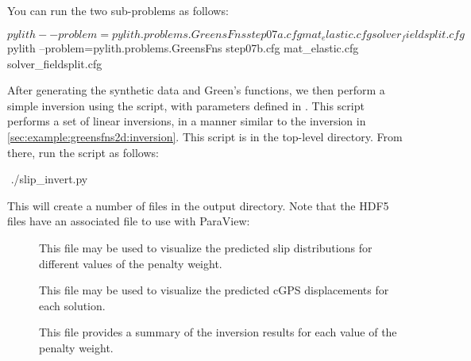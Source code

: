 You can run the two sub-problems as follows:
\begin{shell}
$$ pylith --problem=pylith.problems.GreensFns step07a.cfg
mat_elastic.cfg solver_fieldsplit.cfg
$$ pylith --problem=pylith.problems.GreensFns step07b.cfg
mat_elastic.cfg solver_fieldsplit.cfg
\end{shell}

After generating the synthetic data and Green's functions, we then
perform a simple inversion using the  script,
with parameters defined in . This script
performs a set of linear inversions, in a manner similar to the
inversion in \vref{sec:example:greensfns2d:inversion}. This script is
in the top-level  directory. From there, run the
script as follows:
\begin{shell}
$$ ./slip_invert.py
\end{shell}
This will create a number of files in the output directory. Note that
the HDF5 files have an associated  file to use with
ParaView:
\begin{description}
\item[] This file may
  be used to visualize the predicted slip distributions for different
  values of the penalty weight.
\item[] This file may be used to
  visualize the predicted cGPS displacements for each solution.
\item[] This file provides a summary
  of the inversion results for each value of the penalty weight.
\end{description}

